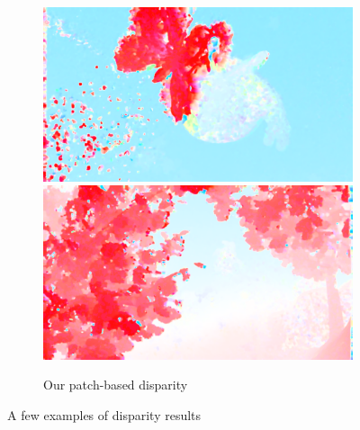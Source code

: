 \begin{figure}
	\begin{subfigure}[t]{0.24\textwidth}
		\includegraphics[width=\textwidth]{figures/uv/frame-0076}\\
		\includegraphics[width=\textwidth]{figures/uv/frame-0391}
		\caption{Our patch-based disparity}
	\end{subfigure}
	\caption{A few examples of disparity results}
	\label{fig:disp_results}
\end{figure}